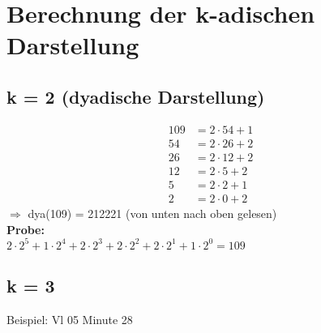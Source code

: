 \documentclass{article}
\begin{document}
\section{Berechnung der k-adischen Darstellung}
\subsection{k = 2 (dyadische Darstellung)}

\begin{align*}
    109 &= 2 \cdot 54 + 1 \\
    54 &= 2 \cdot 26 + 2 \\
    26 &= 2 \cdot 12 + 2 \\
    12 &= 2 \cdot 5 + 2 \\
    5 &= 2 \cdot 2 + 1 \\
    2 &= 2 \cdot 0 + 2
\end{align*}
$\Rightarrow$ dya(109) = 212221 (von unten nach oben gelesen) \\
\textbf{Probe:} \\
$2 \cdot 2^5 +  1 \cdot 2^4 + 2 \cdot 2^3 + 2 \cdot 2^2 + 2 \cdot 2^1 + 1 \cdot 2^0 = 109$

\subsection{k = 3}
Beispiel: Vl 05 Minute 28
\end{document}
